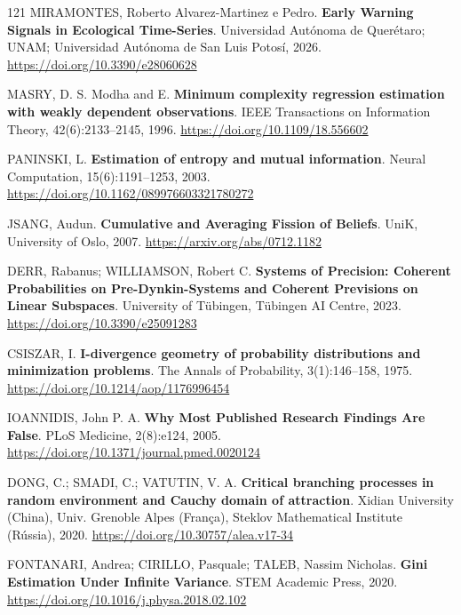 \begin{thebibliography}{121}
  MIRAMONTES, Roberto Alvarez-Martinez e Pedro.
  \newblock \textbf{Early Warning Signals in Ecological Time-Series}.
  \newblock Universidad Autónoma de Querétaro; UNAM; Universidad Autónoma de San Luis Potosí, 2026.
  \newblock \url{https://doi.org/10.3390/e28060628}

  MASRY, D. S. Modha and E.
  \newblock \textbf{Minimum complexity regression estimation with weakly dependent observations}.
  \newblock IEEE Transactions on Information Theory, 42(6):2133--2145, 1996.
  \newblock \url{https://doi.org/10.1109/18.556602}

  PANINSKI, L.
  \newblock \textbf{Estimation of entropy and mutual information}.
  \newblock Neural Computation, 15(6):1191--1253, 2003.
  \newblock \url{https://doi.org/10.1162/089976603321780272}

  JSANG, Audun.
  \newblock \textbf{Cumulative and Averaging Fission of Beliefs}.
  \newblock UniK, University of Oslo, 2007.
  \newblock \url{https://arxiv.org/abs/0712.1182}

  DERR, Rabanus; WILLIAMSON, Robert C.
  \newblock \textbf{Systems of Precision: Coherent Probabilities on Pre-Dynkin-Systems and Coherent Previsions on Linear Subspaces}.
  \newblock University of Tübingen, Tübingen AI Centre, 2023.
  \newblock \url{https://doi.org/10.3390/e25091283}

  CSISZAR, I.
  \newblock \textbf{I-divergence geometry of probability distributions and minimization problems}.
  \newblock The Annals of Probability, 3(1):146--158, 1975.
  \newblock \url{https://doi.org/10.1214/aop/1176996454}

  IOANNIDIS, John P. A.
  \newblock \textbf{Why Most Published Research Findings Are False}.
  \newblock PLoS Medicine, 2(8):e124, 2005.
  \newblock \url{https://doi.org/10.1371/journal.pmed.0020124}

  DONG, C.; SMADI, C.; VATUTIN, V. A.
  \newblock \textbf{Critical branching processes in random environment and Cauchy domain of attraction}.
  \newblock Xidian University (China), Univ. Grenoble Alpes (França), Steklov Mathematical Institute (Rússia), 2020.
  \newblock \url{https://doi.org/10.30757/alea.v17-34}

  FONTANARI, Andrea; CIRILLO, Pasquale; TALEB, Nassim Nicholas.
  \newblock \textbf{Gini Estimation Under Infinite Variance}.
  \newblock STEM Academic Press, 2020.
  \newblock \url{https://doi.org/10.1016/j.physa.2018.02.102}


\end{thebibliography}
